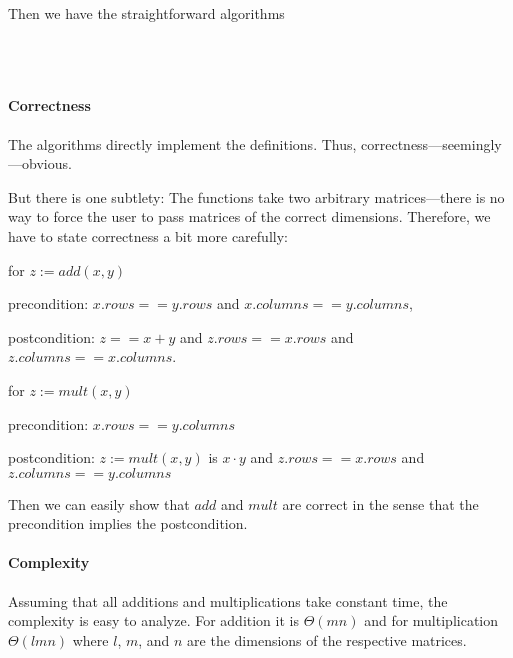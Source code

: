 Then we have the straightforward algorithms
\begin{acode}
 \\
\\
\end{acode}

\paragraph{Correctness}
The algorithms directly implement the definitions.
Thus, correctness---seemingly---obvious.

But there is one subtlety: The functions take two arbitrary matrices---there is no way to force the user to pass matrices of the correct dimensions.
Therefore, we have to state correctness a bit more carefully:
\begin{compactitem}
 \item for $z:=add(x,y)$
   \begin{compactitem}
     \item[precondition:] $x.rows==y.rows$ and $x.columns==y.columns$,
     \item[postcondition:] $z==x+y$ and $z.rows==x.rows$ and $z.columns==x.columns$.
   \end{compactitem}
 \item for $z:=mult(x,y)$
   \begin{compactitem}
     \item[precondition:]  $x.rows==y.columns$
     \item[postcondition:] $z:=mult(x,y)$ is $x\cdot y$ and $z.rows==x.rows$ and $z.columns==y.columns$
   \end{compactitem}
\end{compactitem}
Then we can easily show that $add$ and $mult$ are correct in the sense that the precondition implies the postcondition.

\paragraph{Complexity}
Assuming that all additions and multiplications take constant time, the complexity is easy to analyze.
For addition it is $\Theta(mn)$ and for multiplication $\Theta(lmn)$ where $l$, $m$, and $n$ are the dimensions of the respective matrices.

